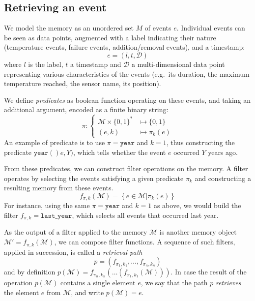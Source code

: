 \documentclass[conference]{IEEEtran}
\begin{document}
\subsection{Retrieving an event}
We model the memory as an unordered set $M$ of events $e$. Individual events can
be seen as data points, augmented with a label indicating their nature
(temperature events, failure events, addition/removal events), and a timestamp:
\begin{equation}
  \label{eq:event}
  e = (l, t,\mathcal{D})
\end{equation}
where $l$ is the label, $t$ a timestamp and $\mathcal{D}$ a multi-dimensional
data point representing various characteristics of the events (e.g.~its duration,
the maximum temperature reached, the sensor name, its position).

We define \emph{predicates} as boolean function operating on these events, and
taking an additional argument, encoded as a finite binary string:
\begin{equation}
  \label{eq:predicate}
  \pi : \begin{cases}
    \mathcal{M}\times \{0,1\}^{*} &\mapsto \{0,1\} \\
    (e, k) &\mapsto \pi_{k}(e)
    \end{cases}
\end{equation}
An example of predicate is to use $\pi = \mathtt{year}$ and $k=1$, thus
constructing the predicate $\mathtt{year()}e, Y\mathtt{)}$, which tells whether
the event $e$ occurred $Y$ years ago.

From these predicates, we can construct filter operations on the memory. A
filter operates by selecting the events satisfying a given predicate
$\pi_{k}$ and constructing a resulting memory from these events.
\begin{equation}
  \label{eq:filter}
 f_{\pi, k}(\mathcal{M}) = \left\{e \in \mathcal{M} | \pi_{k}(e) \right\}
\end{equation}
For instance, using the same $\pi = \mathtt{year}$ and $k=1$ as above, we would
build the filter $f_{\pi, k} = \mathtt{last\_{}year}$, which selects all events
that occurred last year.

As the output of a filter applied to the memory $\mathcal{M}$ is another memory
object $\mathcal{M'} = f_{\pi, k}(\mathcal{M})$, we can compose filter
functions. A sequence of such filters, applied in succession, is called a
\emph{retrieval path}
\begin{equation}
\label{eq:ret_def}
p = (f_{\pi_{1}, k_{1}}, \dots, f_{\pi_{n}, k_{n}})
\end{equation}
and by definition
$p(\mathcal{M}) = f_{\pi_{n}, k_{n}}(\dots(f_{\pi_{1}, k_{1}}(\mathcal{M})))$.
In case the result of the operation $p(\mathcal{M})$ contains a single element
$e$, we say that the path $p$ \emph{retrieves} the element $e$ from $\mathcal{M}$, and write
$p(\mathcal{M}) = e$.
\end{document}
